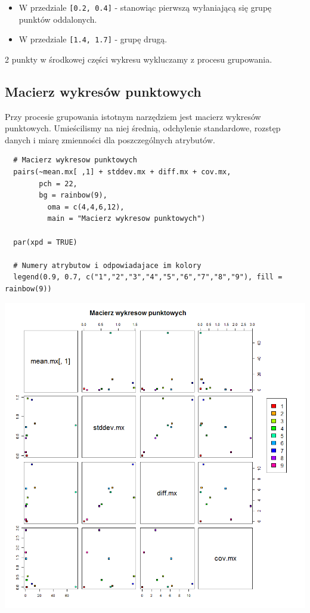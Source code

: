 \documentclass[a4paper,12pt,twoside]{article}
\begin{document}
\begin{itemize}
\item W przedziale \texttt{[0.2, 0.4]} - stanowiąc pierwszą wyłaniającą się grupę punktów oddalonych.
\item W przedziale \texttt{[1.4, 1.7]} - grupę drugą.
\end{itemize}

2 punkty w środkowej części wykresu wykluczamy z procesu grupowania.

\subsection{Macierz wykresów punktowych}

Przy procesie grupowania istotnym narzędziem jest macierz wykresów punktowych. Umieścilismy na niej
średnią, odchylenie standardowe, rozstęp danych i miarę zmienności dla poszczególnych atrybutów.

\medskip
\begin{lstlisting}
  # Macierz wykresow punktowych
  pairs(~mean.mx[ ,1] + stddev.mx + diff.mx + cov.mx,
        pch = 22,
        bg = rainbow(9),
	      oma = c(4,4,6,12),
	      main = "Macierz wykresow punktowych")

  par(xpd = TRUE)

  # Numery atrybutow i odpowiadajace im kolory
  legend(0.9, 0.7, c("1","2","3","4","5","6","7","8","9"), fill = rainbow(9))
\end{lstlisting}

\begin{center}
\includegraphics[width=.90\textwidth]{img/3_macierz_wykresow_punktowych.png}
\end{center}
\end{document}
